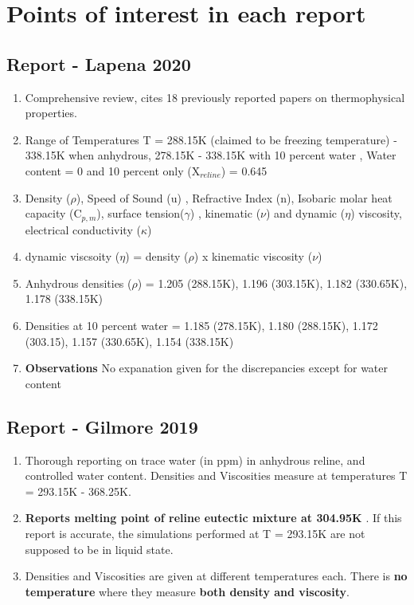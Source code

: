 \documentclass[11pt]{article}
\begin{document}
\section{Points of interest in each report}
\subsection{Report - Lapena 2020 \cite{Lapena2020}}
\begin{enumerate}
\item Comprehensive review, cites 18 previously reported papers on thermophysical properties.
\item Range of Temperatures T = 288.15K (claimed to be freezing temperature) - 338.15K when anhydrous, 278.15K - 338.15K with 10 percent water  , Water content  = 0 and 10 percent only (X$_{reline}$) = 0.645
\item Density ($\rho$), Speed of Sound (u) , Refractive Index (n), Isobaric molar heat capacity (C$_{p,m}$), surface tension($\gamma$) , kinematic ($\nu$) and dynamic ($\eta$) viscosity, electrical conductivity ($\kappa$)
\item dynamic viscsoity ($\eta$) = density ($\rho$) x kinematic viscosity ($\nu$)
\item Anhydrous densities ($\rho$) = 1.205 (288.15K), 1.196 (303.15K), 1.182 (330.65K), 1.178 (338.15K)
\item Densities at 10 percent water = 1.185 (278.15K), 1.180 (288.15K), 1.172 (303.15), 1.157 (330.65K), 1.154 (338.15K)
\item \textbf{Observations} No expanation given for the discrepancies except for water content
\end{enumerate}
\subsection{Report - Gilmore 2019 \cite{Gilmore2019}}
\begin{enumerate}
\item Thorough reporting on trace water (in ppm) in anhydrous reline, and controlled water content. Densities and Viscosities measure at temperatures T = 293.15K - 368.25K.  
\item \textbf{Reports melting point of reline eutectic mixture at 304.95K} . If this report is accurate, the simulations performed at T = 293.15K are not supposed to be in liquid state. 
\item Densities and Viscosities are given at different temperatures each. There is \textbf{no temperature} where they measure \textbf{both density and viscosity}.
\end{enumerate}
\end{document}
